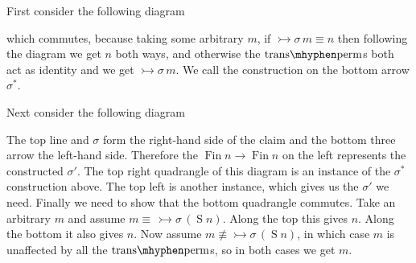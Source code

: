 \documentclass[12pt, parskip, DIV=14]{scrbook}
\renewcommand{\circ}{\vysmwhtcircle}
\newcommand{\Fin}{\operatorname{Fin}}
\newcommand{\Suc}{\operatorname{S}}
\newcommand{\trans}{\operatorname{trans\mhyphen perm}}
\newcommand{\inc}{\operatorname{inc}}
\begin{document}
First consider the following diagram
\begin{center}
\end{center}
which commutes, because taking some arbitrary $m$, if $\rightarrowtail \sigma\,m \equiv n$ then following the diagram we get $n$ both ways, and otherwise the $\trans$s both act as identity and we get $\rightarrowtail \sigma\,m$. We call the construction on the bottom arrow $\sigma^*$.

Next consider the following diagram
\begin{center}
\end{center}
The top line and $\sigma$ form the right-hand side of the claim and the bottom three arrow the left-hand side. Therefore the $\Fin n \to \Fin n$ on the left represents the constructed $\sigma'$. The top right quadrangle of this diagram is an instance of the $\sigma^*$ construction above. The top left is another instance, which gives us the $\sigma'$ we need. Finally we need to show that the bottom quadrangle commutes. Take an arbitrary $m$ and assume $m \equiv\,\rightarrowtail \sigma\,(\Suc n)$. Along the top this gives $n$. Along the bottom it also gives $n$. Now assume $m \nequiv \rightarrowtail \sigma\,(\Suc n)$, in which case $m$ is unaffected by all the $\trans$s, so in both cases we get $m$.
\end{document}
